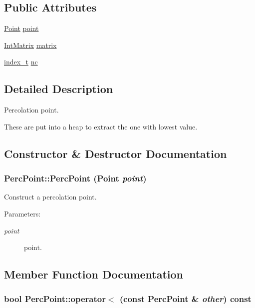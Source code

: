 \subsection*{Public Attributes}
\begin{CompactItemize}
\item 
\hyperlink{class_point}{Point} \hyperlink{class_perc_point_6f5497e144144fa0f0e5e4783ab30761}{point}
\item 
\hyperlink{cowichan_8hpp_82321152ddeeefe9c61350a42ed9e7af}{IntMatrix} \hyperlink{class_perc_point_730c461b6a04bcb883d60df9b297b5d5}{matrix}
\item 
\hyperlink{cowichan_8hpp_5b04577d5d21124855deaad298595371}{index\_\-t} \hyperlink{class_perc_point_dc46d54bf942be6e7774ae522e563f87}{nc}
\end{CompactItemize}


\subsection{Detailed Description}
Percolation point. 

These are put into a heap to extract the one with lowest value. 

\subsection{Constructor \& Destructor Documentation}
\hypertarget{class_perc_point_52b0b83113727e5d43ac0d3db3125ad0}{
\subsubsection[{PercPoint}]{\setlength{\rightskip}{0pt plus 5cm}PercPoint::PercPoint ({\bf Point} {\em point})}}
\label{class_perc_point_52b0b83113727e5d43ac0d3db3125ad0}


Construct a percolation point. \begin{Desc}
\item[Parameters:]
\begin{description}
\item[{\em point}]point. \end{description}
\end{Desc}


\subsection{Member Function Documentation}
\hypertarget{class_perc_point_f798aa389b770208bd172542267ec811}{
\subsubsection[{operator$<$}]{\setlength{\rightskip}{0pt plus 5cm}bool PercPoint::operator$<$ (const {\bf PercPoint} \& {\em other}) const}}
\label{class_perc_point_f798aa389b770208bd172542267ec811}


